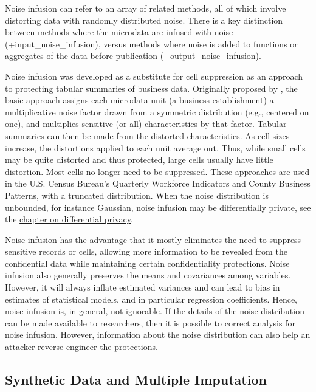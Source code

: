 \documentclass[
]{book}
\begin{document}
Noise infusion can refer to an array of related methods, all of which involve distorting data with randomly distributed noise. There is a key distinction between methods where the microdata are infused with noise (+input\_noise\_infusion\textbar), versus methods where noise is added to functions or aggregates of the data before publication (+output\_noise\_infusion\textbar).

Noise infusion was developed as a substitute for cell suppression as an approach to protecting tabular summaries of business data. Originally proposed by \citet{evans_using_1998}, the basic approach assigns each microdata unit (a business establishment) a multiplicative noise factor drawn from a symmetric distribution (e.g., centered on one), and multiplies sensitive (or all) characteristics by that factor. Tabular summaries can then be made from the distorted characteristics. As cell sizes increase, the distortions applied to each unit average out. Thus, while small cells may be quite distorted and thus protected, large cells usually have little distortion. Most cells no longer need to be suppressed. These approaches are used in the U.S. Census Bureau's Quarterly Workforce Indicators \citetext{\citealp[ ]{abowd_lehd_2009}; \citealp{abowd_dynamically_2012}} and County Business Patterns, with a truncated distribution. When the noise distribution is unbounded, for instance Gaussian, noise infusion may be differentially private, see the \protect\hyperlink{diffpriv}{chapter on differential privacy}.

Noise infusion has the advantage that it mostly eliminates the need to suppress sensitive records or cells, allowing more information to be revealed from the confidential data while maintaining certain confidentiality protections. Noise infusion also generally preserves the means and covariances among variables. However, it will always inflate estimated variances and can lead to bias in estimates of statistical models, and in particular regression coefficients. Hence, noise infusion is, in general, not ignorable. If the details of the noise distribution can be made available to researchers, then it is possible to correct analysis for noise infusion. However, information about the noise distribution can also help an attacker reverse engineer the protections.

\hypertarget{synthetic-data-and-multiple-imputation}{%
\subsection{Synthetic Data and Multiple Imputation}\label{synthetic-data-and-multiple-imputation}}
\end{document}
